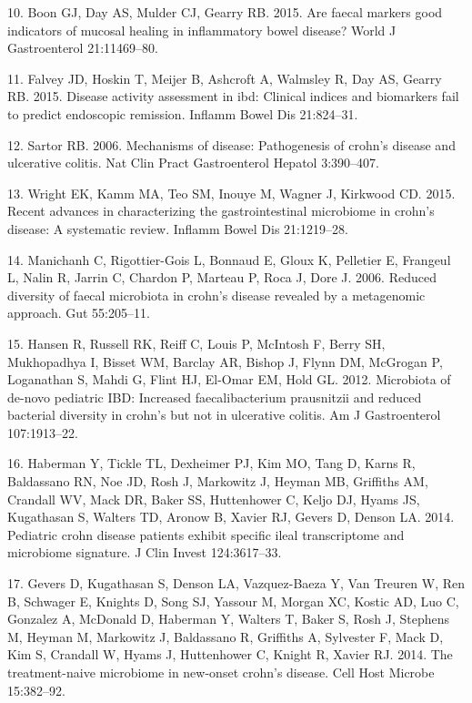 \documentclass[11pt,]{article}
\begin{document}
\hypertarget{ref-Boon_biomarkers_2015}{}
10. Boon GJ, Day AS, Mulder CJ, Gearry RB. 2015. Are faecal markers good
indicators of mucosal healing in inflammatory bowel disease? World J
Gastroenterol 21:11469--80.

\hypertarget{ref-Falvey_biomarkers_2015}{}
11. Falvey JD, Hoskin T, Meijer B, Ashcroft A, Walmsley R, Day AS,
Gearry RB. 2015. Disease activity assessment in ibd: Clinical indices
and biomarkers fail to predict endoscopic remission. Inflamm Bowel Dis
21:824--31.

\hypertarget{ref-sartor_IBDpath_2006}{}
12. Sartor RB. 2006. Mechanisms of disease: Pathogenesis of crohn's
disease and ulcerative colitis. Nat Clin Pract Gastroenterol Hepatol
3:390--407.

\hypertarget{ref-wright_CDmicrobiome_2015}{}
13. Wright EK, Kamm MA, Teo SM, Inouye M, Wagner J, Kirkwood CD. 2015.
Recent advances in characterizing the gastrointestinal microbiome in
crohn's disease: A systematic review. Inflamm Bowel Dis 21:1219--28.

\hypertarget{ref-manichanh_diversityCD_2006}{}
14. Manichanh C, Rigottier-Gois L, Bonnaud E, Gloux K, Pelletier E,
Frangeul L, Nalin R, Jarrin C, Chardon P, Marteau P, Roca J, Dore J.
2006. Reduced diversity of faecal microbiota in crohn's disease revealed
by a metagenomic approach. Gut 55:205--11.

\hypertarget{ref-hansen_pedsIBD_2012}{}
15. Hansen R, Russell RK, Reiff C, Louis P, McIntosh F, Berry SH,
Mukhopadhya I, Bisset WM, Barclay AR, Bishop J, Flynn DM, McGrogan P,
Loganathan S, Mahdi G, Flint HJ, El-Omar EM, Hold GL. 2012. Microbiota
of de-novo pediatric IBD: Increased faecalibacterium prausnitzii and
reduced bacterial diversity in crohn's but not in ulcerative colitis. Am
J Gastroenterol 107:1913--22.

\hypertarget{ref-haberman_pedsCD_2014}{}
16. Haberman Y, Tickle TL, Dexheimer PJ, Kim MO, Tang D, Karns R,
Baldassano RN, Noe JD, Rosh J, Markowitz J, Heyman MB, Griffiths AM,
Crandall WV, Mack DR, Baker SS, Huttenhower C, Keljo DJ, Hyams JS,
Kugathasan S, Walters TD, Aronow B, Xavier RJ, Gevers D, Denson LA.
2014. Pediatric crohn disease patients exhibit specific ileal
transcriptome and microbiome signature. J Clin Invest 124:3617--33.

\hypertarget{ref-gevers_pedsCD_2014}{}
17. Gevers D, Kugathasan S, Denson LA, Vazquez-Baeza Y, Van Treuren W,
Ren B, Schwager E, Knights D, Song SJ, Yassour M, Morgan XC, Kostic AD,
Luo C, Gonzalez A, McDonald D, Haberman Y, Walters T, Baker S, Rosh J,
Stephens M, Heyman M, Markowitz J, Baldassano R, Griffiths A, Sylvester
F, Mack D, Kim S, Crandall W, Hyams J, Huttenhower C, Knight R, Xavier
RJ. 2014. The treatment-naive microbiome in new-onset crohn's disease.
Cell Host Microbe 15:382--92.
\end{document}
